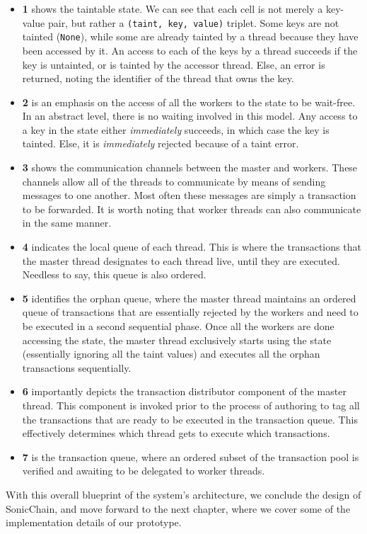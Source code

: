 \begin{itemize}
	\item \textbf{1} shows the taintable state. We can see that each cell is not merely a key-value
	pair, but rather a \texttt{(taint, key, value)} triplet. Some keys are not tainted
	(\texttt{None}), while some are already tainted by a thread because they have been accessed by
	it. An access to each of the keys by a thread succeeds if the key is untainted, or is tainted by
	the accessor thread. Else, an error is returned, noting the identifier of the thread that owns
	the key.
	\item \textbf{2} is an emphasis on the access of all the workers to the state to be wait-free.
	In an abstract level, there is no waiting involved in this model. Any access to a key in the
	state either \textit{immediately} succeeds, in which case the key is tainted. Else, it is
	\textit{immediately} rejected because of a taint error.
	\item \textbf{3} shows the communication channels between the master and workers. These channels
	allow all of the threads to communicate by means of sending messages to one another. Most
	often these messages are simply a transaction to be forwarded. It is worth noting that worker
	threads can also communicate in the same manner.
	\item \textbf{4} indicates the local queue of each thread. This is where the transactions that the
	master thread designates to each thread live, until they are executed. Needless to say, this
	queue is also ordered.
	\item \textbf{5} identifies the orphan queue, where the master thread maintains an ordered queue of
	transactions that are essentially rejected by the workers and need to be executed in a second
	sequential phase. Once all the workers are done accessing the state, the master thread
	exclusively starts using the state (essentially ignoring all the taint values) and executes
	all the orphan transactions sequentially.
	\item \textbf{6} importantly depicts the transaction distributor component of the master thread.
	This component is invoked prior to the process of authoring to tag all the transactions that are
	ready to be executed in the transaction queue. This effectively determines which thread gets to
	execute which transactions.
	\item \textbf{7} is the transaction queue, where an ordered subset of the transaction pool is
	verified and awaiting to be delegated to worker threads.
\end{itemize}

With this overall blueprint of the system's architecture, we conclude the design of SonicChain, and move forward to the next chapter, where
we cover some of the implementation details of our prototype.






